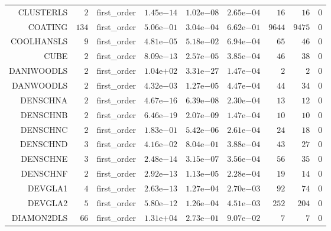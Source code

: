 \begin{longtable}{rrrrrrrrr}
CLUSTERLS & \(     2\) & first\_order & \( 1.45\)e\(-14\) & \( 1.02\)e\(-08\) & \( 2.65\)e\(-04\) & \(    16\) & \(    16\) & \(     0\) \\
COATING & \(   134\) & first\_order & \( 5.06\)e\(-01\) & \( 3.04\)e\(-04\) & \( 6.62\)e\(-01\) & \(  9644\) & \(  9475\) & \(     0\) \\
COOLHANSLS & \(     9\) & first\_order & \( 4.81\)e\(-05\) & \( 5.18\)e\(-02\) & \( 6.94\)e\(-04\) & \(    65\) & \(    46\) & \(     0\) \\
CUBE & \(     2\) & first\_order & \( 8.09\)e\(-13\) & \( 2.57\)e\(-05\) & \( 3.85\)e\(-04\) & \(    46\) & \(    38\) & \(     0\) \\
DANIWOODLS & \(     2\) & first\_order & \( 1.04\)e\(+02\) & \( 3.31\)e\(-27\) & \( 1.47\)e\(-04\) & \(     2\) & \(     2\) & \(     0\) \\
DANWOODLS & \(     2\) & first\_order & \( 4.32\)e\(-03\) & \( 1.27\)e\(-05\) & \( 4.47\)e\(-04\) & \(    44\) & \(    34\) & \(     0\) \\
DENSCHNA & \(     2\) & first\_order & \( 4.67\)e\(-16\) & \( 6.39\)e\(-08\) & \( 2.30\)e\(-04\) & \(    13\) & \(    12\) & \(     0\) \\
DENSCHNB & \(     2\) & first\_order & \( 6.46\)e\(-19\) & \( 2.07\)e\(-09\) & \( 1.47\)e\(-04\) & \(    10\) & \(    10\) & \(     0\) \\
DENSCHNC & \(     2\) & first\_order & \( 1.83\)e\(-01\) & \( 5.42\)e\(-06\) & \( 2.61\)e\(-04\) & \(    24\) & \(    18\) & \(     0\) \\
DENSCHND & \(     3\) & first\_order & \( 4.16\)e\(-02\) & \( 8.04\)e\(-01\) & \( 3.88\)e\(-04\) & \(    43\) & \(    27\) & \(     0\) \\
DENSCHNE & \(     3\) & first\_order & \( 2.48\)e\(-14\) & \( 3.15\)e\(-07\) & \( 3.56\)e\(-04\) & \(    56\) & \(    35\) & \(     0\) \\
DENSCHNF & \(     2\) & first\_order & \( 2.92\)e\(-13\) & \( 1.13\)e\(-05\) & \( 2.28\)e\(-04\) & \(    19\) & \(    14\) & \(     0\) \\
DEVGLA1 & \(     4\) & first\_order & \( 2.63\)e\(-13\) & \( 1.27\)e\(-04\) & \( 2.70\)e\(-03\) & \(    92\) & \(    74\) & \(     0\) \\
DEVGLA2 & \(     5\) & first\_order & \( 5.80\)e\(-12\) & \( 1.26\)e\(-04\) & \( 4.51\)e\(-03\) & \(   252\) & \(   204\) & \(     0\) \\
DIAMON2DLS & \(    66\) & first\_order & \( 1.31\)e\(+04\) & \( 2.73\)e\(-01\) & \( 9.07\)e\(-02\) & \(     7\) & \(     7\) & \(     0\) \\

\end{longtable}
